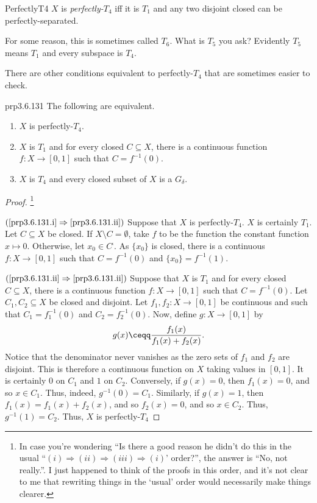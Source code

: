 \begin{dfn}{}{PerfectlyT4}
$X$ is \emph{perfectly-$T_4$} iff it is $T_1$ and any two disjoint closed can be perfectly-separated.
\begin{rmk}
For some reason, this is sometimes called $T_6$.  What is $T_5$ you ask?  Evidently $T_5$ means $T_1$ and every subspace is $T_4$.
\end{rmk}
\end{dfn}
There are other conditions equivalent to perfectly-$T_4$ that are sometimes easier to check.
\begin{prp}{}{prp3.6.131}
The following are equivalent.
\begin{enumerate}
\item \label{prp3.6.131.i}$X$ is perfectly-$T_4$.
\item \label{prp3.6.131.ii}$X$ is $T_1$ and for every closed $C\subseteq X$, there is a continuous function $f\colon X\rightarrow [0,1]$ such that $C=f^{-1}(0)$.
\item \label{prp3.6.131.iii}$X$ is $T_4$ and every closed subset of $X$ is a $G_{\delta}$.
\end{enumerate}
\begin{proof}\footnote{In case you're wondering ``Is there a good reason he didn't do this in the usual ``$(i)\Rightarrow (ii)\Rightarrow (iii)\Rightarrow (i)$' order?'', the answer is ``No, not really.''.  I just happened to think of the proofs in this order, and it's not clear to me that rewriting things in the `usual' order would necessarily make things clearer.}
\forwardref

\noindent
$(\cref{prp3.6.131.i}\Rightarrow \cref{prp3.6.131.ii})$ Suppose that $X$ is perfectly-$T_4$.  $X$ is certainly $T_1$.  Let $C\subseteq X$ be closed.  If $X\setminus C=\emptyset$, take $f$ to be the function the constant function $x\mapsto 0$.  Otherwise, let $x_0\in C^{\comp}$.  As $\{ x_0\}$ is closed, there is a continuous $f\colon X\rightarrow [0,1]$ such that $C=f^{-1}(0)$ and $\{ x_0\} =f^{-1}(1)$.

\blankline
\noindent
$(\cref{prp3.6.131.ii}\Rightarrow \cref{prp3.6.131.ii})$ Suppose that $X$ is $T_1$ and for every closed $C\subseteq X$, there is a continuous function $f\colon X\rightarrow [0,1]$ such that $C=f^{-1}(0)$.  Let $C_1,C_2\subseteq X$ be closed and disjoint.  Let $f_1,f_2\colon X\rightarrow [0,1]$ be continuous and such that $C_1=f_1^{-1}(0)$ and $C_2=f_2^{-1}(0)$.  Now, define $g\colon X\rightarrow [0,1]$ by
\begin{equation}
g(x)\ceqq \frac{f_1(x)}{f_1(x)+f_2(x)}.
\end{equation}
Notice that the denominator never vanishes as the zero sets of $f_1$ and $f_2$ are disjoint.  This is therefore a continuous function on $X$ taking values in $[0,1]$.  It is certainly $0$ on $C_1$ and $1$ on $C_2$.  Conversely, if $g(x)=0$, then $f_1(x)=0$, and so $x\in C_1$.  Thus, indeed, $g^{-1}(0)=C_1$.  Similarly, if $g(x)=1$, then $f_1(x)=f_1(x)+f_2(x)$, and so $f_2(x)=0$, and so $x\in C_2$.  Thus, $g^{-1}(1)=C_2$.  Thus, $X$ is perfectly-$T_4$


\end{proof}
\end{prp}
